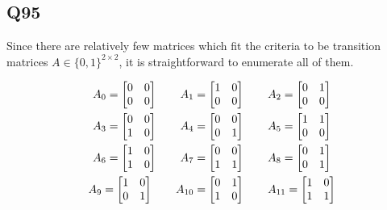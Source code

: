 \documentclass{article}
\begin{document}
\subsection*{Q95}
Since there are relatively few matrices which fit the criteria to be transition matrices $A \in \{0,1\}^{2 \times 2}$, 
it is straightforward to enumerate all of them.

\begin{equation*}
	\begin{split}
	A_0 = \begin{bmatrix}0 & 0 \\ 0 & 0\end{bmatrix} \qquad A_1 = \begin{bmatrix}1 & 0 \\ 0 & 0\end{bmatrix} \qquad A_2 = \begin{bmatrix}0 & 1 \\ 0 & 0\end{bmatrix} \\
	A_3 = \begin{bmatrix}0 & 0 \\ 1 & 0\end{bmatrix} \qquad A_4 = \begin{bmatrix}0 & 0 \\ 0 & 1\end{bmatrix} \qquad A_5 = \begin{bmatrix}1 & 1 \\ 0 & 0\end{bmatrix} \\
	A_6 = \begin{bmatrix}1 & 0 \\ 1 & 0\end{bmatrix} \qquad A_7 = \begin{bmatrix}0 & 0 \\ 1 & 1\end{bmatrix} \qquad A_8 = \begin{bmatrix}0 & 1 \\ 0 & 1\end{bmatrix} \\
	A_9 = \begin{bmatrix}1 & 0 \\ 0 & 1\end{bmatrix} \qquad A_{10} = \begin{bmatrix}0 & 1 \\ 1 & 0\end{bmatrix} \qquad A_{11} = \begin{bmatrix}1 & 0 \\ 1 & 1\end{bmatrix} \hspace{-4pt}\\

\end{split}
\end{equation*}
\end{document}
